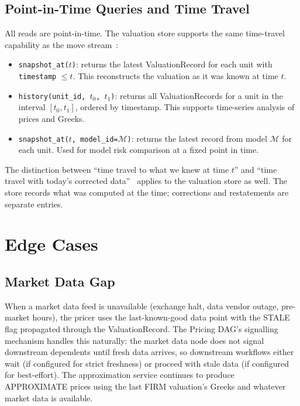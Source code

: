 \documentclass[11pt,a4paper]{article}
\begin{document}
\subsection{Point-in-Time Queries and Time Travel}

All reads are point-in-time.  The valuation store supports the same time-travel capability as the move stream~\cite[\S1.2, Property~6]{ledger}:

\begin{itemize}[nosep]
\item \texttt{snapshot\_at($t$)}: returns the latest ValuationRecord for each unit with \texttt{timestamp} $\leq t$.  This reconstructs the valuation as it was known at time $t$.
\item \texttt{history(unit\_id, $t_0$, $t_1$)}: returns all ValuationRecords for a unit in the interval $[t_0, t_1]$, ordered by timestamp.  This supports time-series analysis of prices and Greeks.
\item \texttt{snapshot\_at($t$, model\_id=$\mathcal{M}$)}: returns the latest record from model $\mathcal{M}$ for each unit.  Used for model risk comparison at a fixed point in time.
\end{itemize}

\noindent The distinction between ``time travel to what we knew at time $t$'' and ``time travel with today's corrected data''~\cite[\S1.2]{ledger} applies to the valuation store as well.  The store records what was computed at the time; corrections and restatements are separate entries.

\clearpage
\section{Edge Cases}
\label{sec:edge-cases}

\subsection{Market Data Gap}

When a market data feed is unavailable (exchange halt, data vendor outage, pre-market hours), the pricer uses the last-known-good data point with the STALE flag propagated through the ValuationRecord.  The Pricing DAG's signalling mechanism handles this naturally: the market data node does not signal downstream dependents until fresh data arrives, so downstream workflows either wait (if configured for strict freshness) or proceed with stale data (if configured for best-effort).  The approximation service continues to produce APPROXIMATE prices using the last FIRM valuation's Greeks and whatever market data is available.
\end{document}
